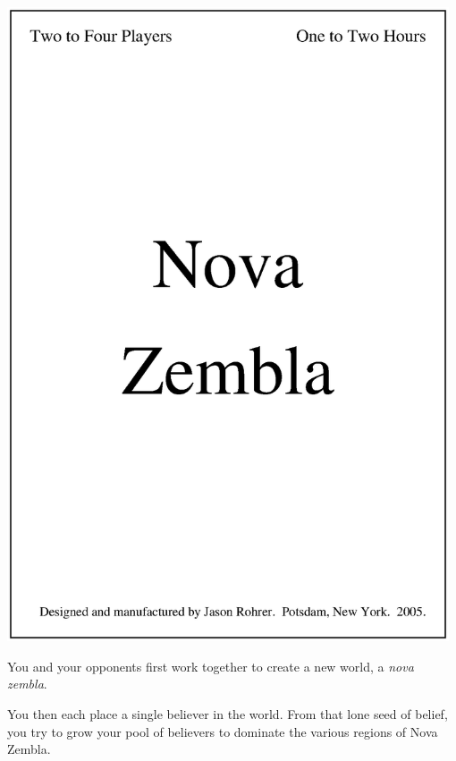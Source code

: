%



\newcommand{\gameName}{Nova Zembla}



\thispagestyle{empty}
\begin{center}

~\vfill

\includegraphics[width=0.98\textwidth]{rule_cover.eps}

\vfill

\end{center}



You and your opponents first work together to create a new world, a {\it nova zembla}.

You then each place a single believer in the world.
From that lone seed of belief, you try to grow your pool of believers to dominate the various regions of \gameName. 

